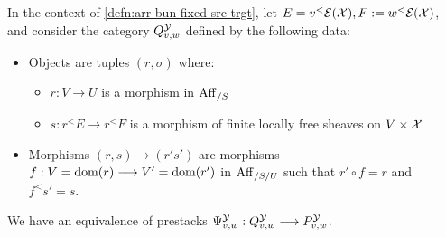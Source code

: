 \documentclass[11pt]{amsart}
\begin{document}
\begin{prop}\label{prop:bndry-map-fibre-simple}
In the context of \cref{defn:arr-bun-fixed-src-trgt}, let
$E = v^<\mathcal{E}(\mathcal{X}), F := w^<\mathcal{E}(\mathcal{X})$, and consider the category
$Q^\mathcal{Y}_{v, w}$ defined by the following data:
\begin{itemize}
\item Objects are tuples $(r, \sigma)$ where:
  \begin{itemize}
  \item $r : V \to U$ is a morphism in $\mathrm{Aff}_{/S}$
  \item $s : r^<E \to r^<F$ is a morphism of finite locally free sheaves on
    $V \times \mathcal{X}$
  \end{itemize}
\item Morphisms $(r, s) \to (r' s')$ are morphisms
    $f : V = \dom(r) \to V' = \dom(r')$ in $\mathrm{Aff}_{/S/U}$ such that
    $r' \circ f = r$ and $f^<s' = s$.
\end{itemize}
We have an equivalence of prestacks
$\Psi_{v, w}^\mcY : Q^\mcY_{v, w} \to P^\mcY_{v, w}$.
\end{prop}
\end{document}

